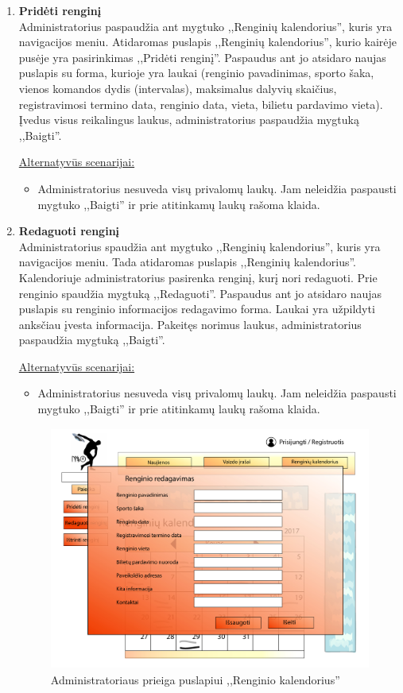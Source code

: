 \documentclass{VUMIFPSkursinis}
\begin{document}
\begin{enumerate} [label = \textbf{U\arabic*.}]
			\item \textbf{Pridėti renginį}   \\
					Administratorius paspaudžia ant mygtuko ,,Renginių kalendorius'', kuris yra navigacijos meniu. Atidaromas puslapis ,,Renginių kalendorius'', kurio kairėje pusėje yra pasirinkimas ,,Pridėti renginį''. Paspaudus ant jo atsidaro naujas puslapis su forma, kurioje yra laukai (renginio pavadinimas, sporto šaka, vienos komandos dydis (intervalas), maksimalus dalyvių skaičius, registravimosi termino data, renginio data, vieta, bilietu pardavimo vieta). Įvedus visus reikalingus laukus, administratorius paspaudžia mygtuką ,,Baigti''.
					
					\underline{Alternatyvūs scenarijai:}
					\begin{itemize}
						\item Administratorius nesuveda visų privalomų laukų. Jam neleidžia paspausti mygtuko ,,Baigti'' ir prie atitinkamų laukų rašoma klaida.
					\end{itemize}
				
			\item \textbf{Redaguoti renginį}   \\
					Administratorius spaudžia ant mygtuko ,,Renginių kalendorius'', kuris yra navigacijos meniu. Tada atidaromas puslapis ,,Renginių kalendorius''. Kalendoriuje administratorius pasirenka renginį, kurį nori redaguoti. Prie renginio spaudžia mygtuką ,,Redaguoti''. Paspaudus ant jo atsidaro naujas puslapis su renginio informacijos redagavimo forma. Laukai yra užpildyti anksčiau įvesta informacija. Pakeitęs norimus laukus, administratorius paspaudžia mygtuką ,,Baigti''.
					
					\underline{Alternatyvūs scenarijai:}
					\begin{itemize}
						\item Administratorius nesuveda visų privalomų laukų. Jam neleidžia paspausti mygtuko ,,Baigti'' ir prie atitinkamų laukų rašoma klaida.
					\end{itemize}
				
				\begin{figure}[H]
					\centering
					\includegraphics[width=\textwidth, height=8cm, keepaspectratio]{img/PSI4/AdminRenginioKalendorius-01.jpg}
					\caption{Administratoriaus prieiga puslapiui ,,Renginio kalendorius''}
					\label{fig:uzd_admin_renginioKalendorius}
				\end{figure}
				

\end{enumerate}
\end{document}

